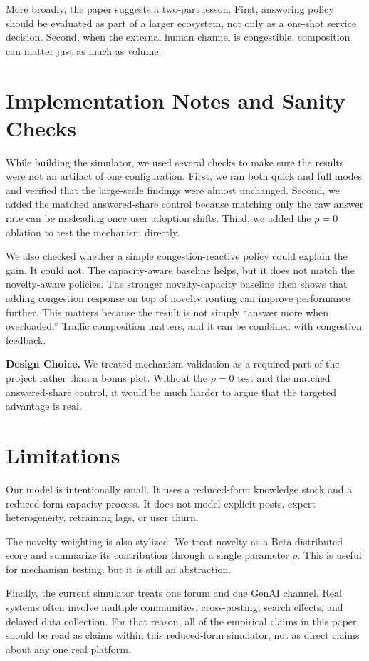 \documentclass{article}
\newenvironment{designchoice}
  {\begin{framed}\noindent\textbf{Design Choice. }}
  {\end{framed}}
\begin{document}
More broadly, the paper suggests a two-part lesson. First, answering policy should be evaluated as part of a larger ecosystem, not only as a one-shot service decision. Second, when the external human channel is congestible, composition can matter just as much as volume.

\section{Implementation Notes and Sanity Checks}
While building the simulator, we used several checks to make sure the results were not an artifact of one configuration. First, we ran both quick and full modes and verified that the large-scale findings were almost unchanged. Second, we added the matched answered-share control because matching only the raw answer rate can be misleading once user adoption shifts. Third, we added the $\rho=0$ ablation to test the mechanism directly.

We also checked whether a simple congestion-reactive policy could explain the gain. It could not. The capacity-aware baseline helps, but it does not match the novelty-aware policies. The stronger novelty-capacity baseline then shows that adding congestion response on top of novelty routing can improve performance further. This matters because the result is not simply ``answer more when overloaded.'' Traffic composition matters, and it can be combined with congestion feedback.

\begin{designchoice}
We treated mechanism validation as a required part of the project rather than a bonus plot. Without the $\rho=0$ test and the matched answered-share control, it would be much harder to argue that the targeted advantage is real.
\end{designchoice}

\section{Limitations}
Our model is intentionally small. It uses a reduced-form knowledge stock and a reduced-form capacity process. It does not model explicit posts, expert heterogeneity, retraining lags, or user churn.

The novelty weighting is also stylized. We treat novelty as a Beta-distributed score and summarize its contribution through a single parameter $\rho$. This is useful for mechanism testing, but it is still an abstraction.

Finally, the current simulator treats one forum and one GenAI channel. Real systems often involve multiple communities, cross-posting, search effects, and delayed data collection. For that reason, all of the empirical claims in this paper should be read as claims within this reduced-form simulator, not as direct claims about any one real platform.
\end{document}
